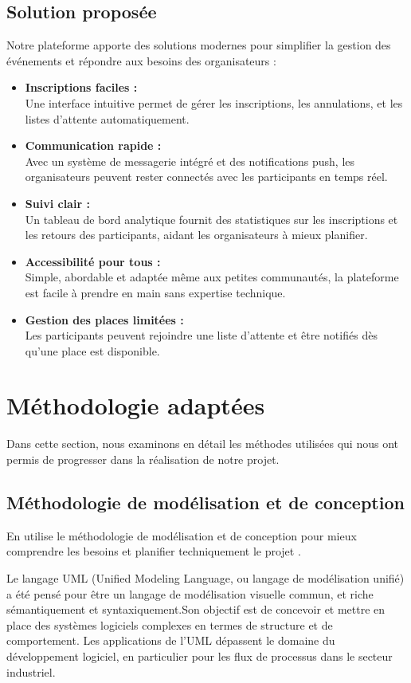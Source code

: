 \subsection{Solution proposée}
Notre plateforme apporte des solutions modernes pour simplifier la gestion des événements et répondre aux besoins des organisateurs :
\begin{itemize}[label=$\star$]
  \item \textbf{Inscriptions faciles :} \\
  Une interface intuitive permet de gérer les inscriptions, les annulations, et les listes d’attente automatiquement.
  \item \textbf{Communication rapide :} \\
  Avec un système de messagerie intégré et des notifications push, les organisateurs peuvent rester connectés avec les participants en temps réel.
  \item \textbf{Suivi clair :} \\
  Un tableau de bord analytique fournit des statistiques sur les inscriptions et les retours des participants, aidant les organisateurs à mieux planifier.
  \item \textbf{Accessibilité pour tous :} \\
  Simple, abordable et adaptée même aux petites communautés, la plateforme est facile à prendre en main sans expertise technique.
  \item \textbf{Gestion des places limitées :} \\
  Les participants peuvent rejoindre une liste d’attente et être notifiés dès qu’une place est disponible.
\end{itemize}
\section {Méthodologie adaptées}
Dans cette section, nous examinons en détail les méthodes utilisées qui nous ont permis de progresser dans la réalisation de notre projet.
\subsection{Méthodologie de modélisation et de conception}
En utilise le méthodologie de modélisation et de conception  pour mieux comprendre les besoins et planifier techniquement le projet .

Le langage UML (Unified Modeling Language, ou langage de modélisation unifié) a été pensé pour être un langage de modélisation visuelle commun, et riche sémantiquement et syntaxiquement.Son objectif est de concevoir et mettre en place des systèmes logiciels complexes en termes de structure et de comportement. Les applications de l’UML dépassent le domaine du développement logiciel, en particulier pour les flux de processus dans le secteur industriel.\cite{ref1}
